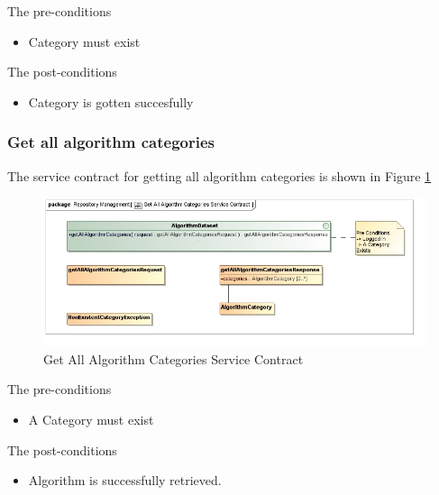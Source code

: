 The pre-conditions
\begin{itemize}
  \item Category must exist
\end{itemize}

The post-conditions
\begin{itemize}
  \item Category is gotten succesfully
\end{itemize}

\subsubsection {Get all algorithm categories}

The service contract for getting all algorithm categories is shown in Figure \ref{fig:getAllAlgorithmCatService}
\begin{figure}[H]
  \begin{center}
  \includegraphics[scale=0.6]{../Diagrams and Charts/Test Data/Get All Algorithm Categories Service Contract.jpg}
  \caption{Get All Algorithm Categories Service Contract}
  \label{fig:getAllAlgorithmCatService}
  \end{center}
  
\end{figure}

The pre-conditions
\begin{itemize}
  \item A Category must exist
\end{itemize}

The post-conditions
\begin{itemize}
  \item Algorithm is successfully retrieved.
\end{itemize}





